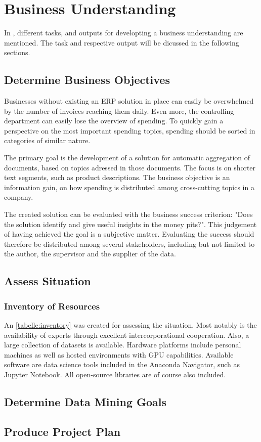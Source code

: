 \chapter{Business Understanding}
In \cite{CRISPDM2000}, different tasks, and outputs for developting a business understanding are mentioned. The task and respective output will be dicussed in the following sections.

\section{Determine Business Objectives}
Businesses without existing an \ac{ERP} solution in place can easily be overwhelmed by the number of invoices reaching them daily. Even more, the controlling department can easily lose the overview of spending. To quickly gain a perspective on the most important spending topics, spending should be sorted in categories of similar nature.

The primary goal is the development of a solution for automatic aggregation of documents, based on topics adressed in those documents. The focus is on shorter text segments, such as product descriptions. The business objective is an information gain, on how spending is distributed among cross-cutting topics in a company.

The created solution can be evaluated with the business success criterion: "Does the solution identify and give useful insights in the money pits?". This judgement of having achieved the goal is a subjective matter. Evaluating the success should therefore be distributed among several stakeholders, including but not limited to the author, the supervisor and the supplier of the data.


\section{Assess Situation}

\subsection{Inventory of Resources}
An \ref{tabelle:inventory} was created for assessing the situation. Most notably is the availability of experts through excellent intercorporational cooperation. Also, a large collection of datasets is available. Hardware platforms include personal machines as well as hosted environments with GPU capabilities. Available software are data science tools included in the Anaconda Navigator, such as Jupyter Notebook. All open-source libraries are of course also included.

\section{Determine Data Mining Goals}


\section{Produce Project Plan}